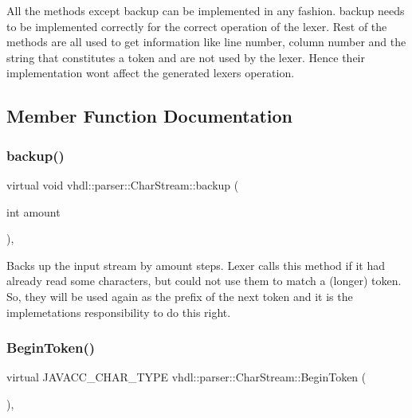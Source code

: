 All the methods except backup can be implemented in any fashion. backup needs to be implemented correctly for the correct operation of the lexer. Rest of the methods are all used to get information like line number, column number and the string that constitutes a token and are not used by the lexer. Hence their implementation won\textquotesingle{}t affect the generated lexer\textquotesingle{}s operation. 

\subsection{Member Function Documentation}
\mbox{\label{classvhdl_1_1parser_1_1_char_stream_aea30b248a3b05857e3e60101afd2617a}} 
\subsubsection{\texorpdfstring{backup()}{backup()}}
{\footnotesize\ttfamily virtual void vhdl\+::parser\+::\+Char\+Stream\+::backup (\begin{DoxyParamCaption}\item[{int}]{amount }\end{DoxyParamCaption})\hspace{0.3cm}{\ttfamily [inline]}, {\ttfamily [virtual]}}

Backs up the input stream by amount steps. Lexer calls this method if it had already read some characters, but could not use them to match a (longer) token. So, they will be used again as the prefix of the next token and it is the implemetation\textquotesingle{}s responsibility to do this right. \mbox{\label{classvhdl_1_1parser_1_1_char_stream_abfef003263c49f685bfd49610dc12a08}} 
\subsubsection{\texorpdfstring{BeginToken()}{BeginToken()}}
{\footnotesize\ttfamily virtual J\+A\+V\+A\+C\+C\+\_\+\+C\+H\+A\+R\+\_\+\+T\+Y\+PE vhdl\+::parser\+::\+Char\+Stream\+::\+Begin\+Token (\begin{DoxyParamCaption}{ }\end{DoxyParamCaption})\hspace{0.3cm}{\ttfamily [inline]}, {\ttfamily [virtual]}}

